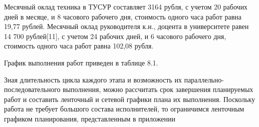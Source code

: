 Месячный оклад техника в ТУСУР составляет 3164 рубля, с учетом 20 рабочих дней в месяце, и 8 часового рабочего дня, стоимость одного часа работ равна 19,77 рублей. Месячный оклад руководителя к.н., доцента в университете равен 14 700 рублей[11], с учетом 24 рабочих дней, и 6 часового рабочего дня, стоимость одного часа работ равна 102,08 рубля.

График выполнения работ приведен в таблице 8.1.

Зная длительность цикла каждого этапа и возможность их параллельно-последовательного выполнения, можно рассчитать срок завершения планируемых работ и составить ленточный и сетевой графики плана их выполнения. Поскольку работа не требует большого состава исполнителей, то ограничимся ленточным графиком планирования, представленным в приложении %

 
 
 